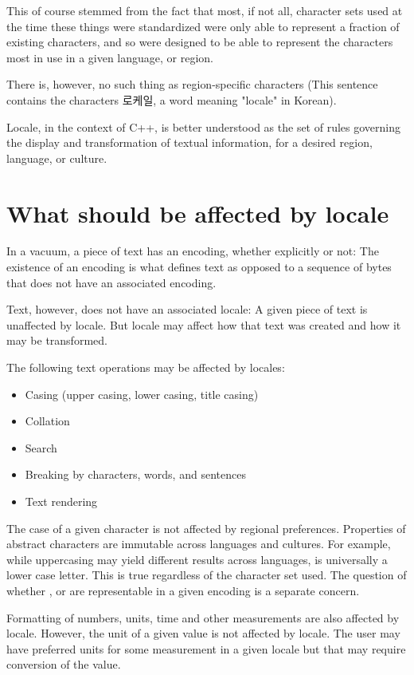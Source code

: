 \documentclass{wg21}
\newcommand{\UnicodeLetter}[1]{\textbf{\textcolor{BrickRed}{\Large\tcode{#1}}}}
\begin{document}
This of course stemmed from the fact that most, if not all, character sets used at the time these things were standardized were only able to represent a fraction of existing characters, and so were designed to be able to represent the characters most in use in a given language, or region.

There is, however, no such thing as region-specific characters (This sentence contains the characters 로케일, a word meaning "locale" in Korean).

Locale, in the context of C++, is better understood as the set of rules governing the display and transformation of textual information, for a desired region, language, or culture.

\section{What should be affected by locale}

In a vacuum, a piece of text has an encoding, whether explicitly or not: The existence of an encoding is what defines text as opposed to a sequence of bytes that does not have an associated encoding.

Text, however, does not have an associated locale: A given piece of text is unaffected by locale.
But locale may affect how that text was created and how it may be transformed.

The following text operations may be affected by locales:
\begin{itemize}
    \item Casing (upper casing, lower casing, title casing)
    \item Collation
    \item Search
    \item Breaking by characters, words, and sentences
    \item Text rendering
\end{itemize}

The case of a given character is not affected by regional preferences. Properties of abstract characters are immutable across languages and cultures. For example, while uppercasing \UnicodeLetter{ss} may yield different results across languages, \UnicodeLetter{s} is universally a lower case letter. This is true regardless of the character set used.
The question of whether \UnicodeLetter{s}, \UnicodeLetter{S} or \UnicodeLetter{ß} are representable in a given encoding is a separate concern.

Formatting of numbers, units, time and other measurements are also affected by locale.
However, the unit of a given value is not affected by locale.
The user may have preferred units for some measurement in a given locale but that may require conversion of the value.
\end{document}
